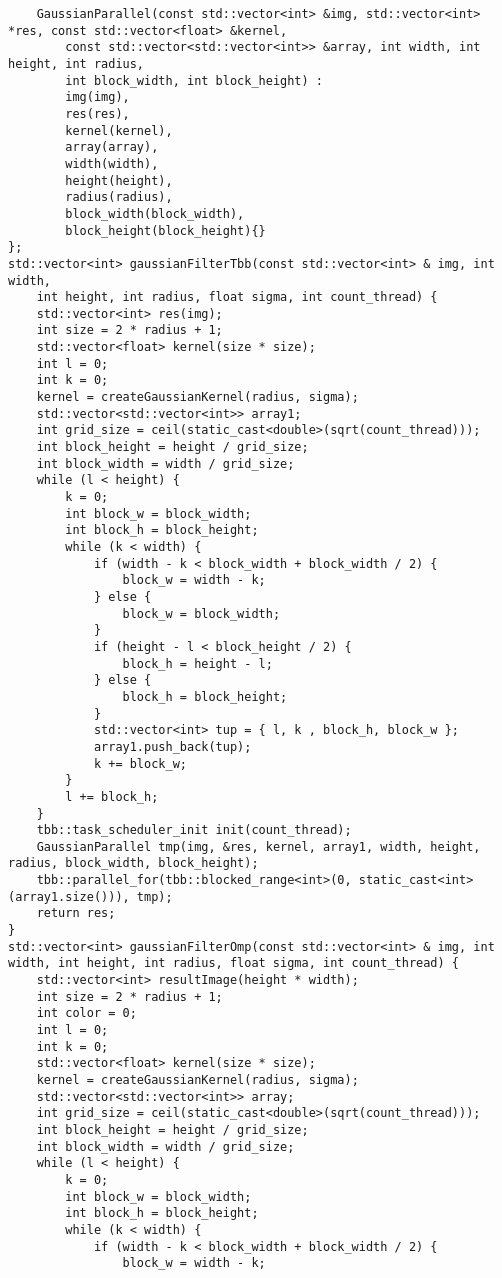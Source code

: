 \documentclass{report}
\begin{document}
\begin{lstlisting}
    GaussianParallel(const std::vector<int> &img, std::vector<int> *res, const std::vector<float> &kernel,
        const std::vector<std::vector<int>> &array, int width, int height, int radius,
        int block_width, int block_height) :
        img(img),
        res(res),
        kernel(kernel),
        array(array),
        width(width),
        height(height),
        radius(radius),
        block_width(block_width),
        block_height(block_height){}
};
std::vector<int> gaussianFilterTbb(const std::vector<int> & img, int width,
    int height, int radius, float sigma, int count_thread) {
    std::vector<int> res(img);
    int size = 2 * radius + 1;
    std::vector<float> kernel(size * size);
    int l = 0;
    int k = 0;
    kernel = createGaussianKernel(radius, sigma);
    std::vector<std::vector<int>> array1;
    int grid_size = ceil(static_cast<double>(sqrt(count_thread)));
    int block_height = height / grid_size;
    int block_width = width / grid_size;
    while (l < height) {
        k = 0;
        int block_w = block_width;
        int block_h = block_height;
        while (k < width) {
            if (width - k < block_width + block_width / 2) {
                block_w = width - k;
            } else {
                block_w = block_width;
            }
            if (height - l < block_height / 2) {
                block_h = height - l;
            } else {
                block_h = block_height;
            }
            std::vector<int> tup = { l, k , block_h, block_w };
            array1.push_back(tup);
            k += block_w;
        }
        l += block_h;
    }
    tbb::task_scheduler_init init(count_thread);
    GaussianParallel tmp(img, &res, kernel, array1, width, height, radius, block_width, block_height);
    tbb::parallel_for(tbb::blocked_range<int>(0, static_cast<int>(array1.size())), tmp);
    return res;
}
std::vector<int> gaussianFilterOmp(const std::vector<int> & img, int width, int height, int radius, float sigma, int count_thread) {
    std::vector<int> resultImage(height * width);
    int size = 2 * radius + 1;
    int color = 0;
    int l = 0;
    int k = 0;
    std::vector<float> kernel(size * size);
    kernel = createGaussianKernel(radius, sigma);
    std::vector<std::vector<int>> array;
    int grid_size = ceil(static_cast<double>(sqrt(count_thread)));
    int block_height = height / grid_size;
    int block_width = width / grid_size;
    while (l < height) {
        k = 0;
        int block_w = block_width;
        int block_h = block_height;
        while (k < width) {
            if (width - k < block_width + block_width / 2) {
                block_w = width - k;


\end{lstlisting}
\end{document}
